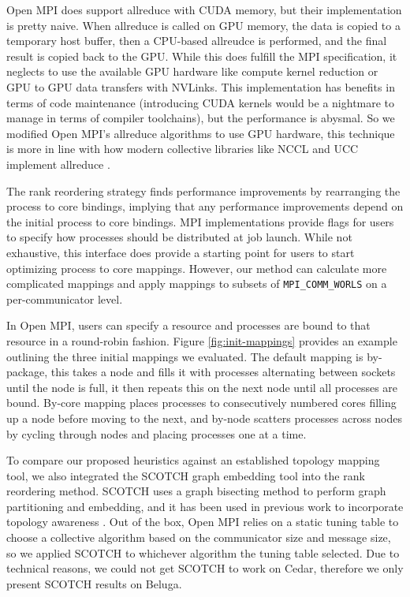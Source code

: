 Open MPI does support allreduce with \gls{CUDA} memory, but their implementation is pretty naive.
When allreduce is called on \gls{GPU} memory, the data is copied to a temporary host buffer, then a \gls{CPU}-based allreudce is performed, and the final result is copied back to the \gls{GPU}.
While this does fulfill the \gls{MPI} specification, it neglects to use the available \gls{GPU} hardware like compute kernel reduction or \gls{GPU} to \gls{GPU} data transfers with NVLinks.
This implementation has benefits in terms of code maintenance (introducing \gls{CUDA} kernels would be a nightmare to manage in terms of compiler toolchains), but the performance is abysmal. 
So we modified Open MPI's allreduce algorithms to use \gls{GPU} hardware, this technique is more in line with how modern collective libraries like \gls{NCCL} and \gls{UCC} implement allreduce \cite{UCC, NCCL}.

The rank reordering strategy finds performance improvements by rearranging the process to core bindings, implying that any performance improvements depend on the initial process to core bindings.
\gls{MPI} implementations provide flags for users to specify how processes should be distributed at job launch. 
While not exhaustive, this interface does provide a starting point for users to start optimizing process to core mappings.
However, our method can calculate more complicated mappings and apply mappings to subsets of \texttt{MPI\_COMM\_WORLS} on a per-communicator level.

In Open MPI, users can specify a resource and processes are bound to that resource in a round-robin fashion.
Figure \ref{fig:init-mappings} provides an example outlining the three initial mappings we evaluated.
The default mapping is by-package, this takes a node and fills it with processes alternating between sockets until the node is full, it then repeats this on the next node until all processes are bound.
By-core mapping places processes to consecutively numbered cores filling up a node before moving to the next, and by-node scatters processes across nodes by cycling through nodes and placing processes one at a time.



To compare our proposed heuristics against an established topology mapping tool, we also integrated the SCOTCH graph embedding tool \cite{Pellegrini2012SCOTCH} into the rank reordering method.
SCOTCH uses a graph bisecting method to perform graph partitioning and embedding, and it has been used in previous work to incorporate topology awareness \cite{Mirsadeghi2016TopoAwareCollRR, Bordage2018Netloc, Deveci2015FastHQTopoAwareTaskMapping}.
Out of the box, Open MPI relies on a static tuning table to choose a collective algorithm based on the communicator size and message size, so we applied SCOTCH to whichever algorithm the tuning table selected.
Due to technical reasons, we could not get SCOTCH to work on Cedar, therefore we only present SCOTCH results on Beluga.

